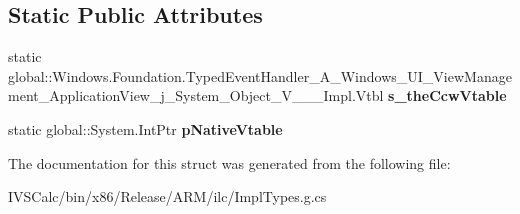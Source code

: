 \subsection*{Static Public Attributes}
\begin{DoxyCompactItemize}
\item 
\mbox{\label{struct_windows_1_1_foundation_1_1_typed_event_handler___a___windows___u_i___view_management___apae42b7600dab322722f60f9705736124_a280cfe715c5e7496aef499b29759ff89}} 
static global\+::\+Windows.\+Foundation.\+Typed\+Event\+Handler\+\_\+\+A\+\_\+\+Windows\+\_\+\+U\+I\+\_\+\+View\+Management\+\_\+\+Application\+View\+\_\+j\+\_\+\+System\+\_\+\+Object\+\_\+\+V\+\_\+\+\_\+\+\_\+\+Impl.\+Vtbl {\bfseries s\+\_\+the\+Ccw\+Vtable}
\item 
\mbox{\label{struct_windows_1_1_foundation_1_1_typed_event_handler___a___windows___u_i___view_management___apae42b7600dab322722f60f9705736124_a935fbced9eb359d6bb23a5a25d1d5ccb}} 
static global\+::\+System.\+Int\+Ptr {\bfseries p\+Native\+Vtable}
\end{DoxyCompactItemize}


The documentation for this struct was generated from the following file\+:\begin{DoxyCompactItemize}
\item 
I\+V\+S\+Calc/bin/x86/\+Release/\+A\+R\+M/ilc/Impl\+Types.\+g.\+cs\end{DoxyCompactItemize}

